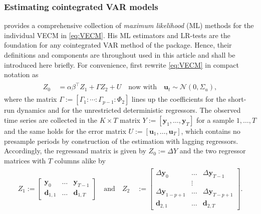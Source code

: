 \subsubsection{Estimating cointegrated VAR models} \label{sec:IndivEst}
\citet{Johansen1991,Johansen1996} provides a comprehensive collection of \textit{maximum likelihood} (ML) methods for the individual VECM in \eqref{eq:VECM}. His ML estimators and LR-tests are the foundation for any cointegrated VAR method of the  package. Hence, their definitions and components are throughout used in this article and shall be introduced here briefly. For convenience, first rewrite \eqref{eq:VECM} in compact notation as
\begin{align} \label{eq:compactVECM}
\begin{split}
	Z_{0} \ & = \alpha\beta^\top Z_{1} + \Gamma Z_{2} + U \quad \text{now with} \quad \boldsymbol{u}_{t} \sim \mathcal{N}(0,\Sigma_u),
\end{split}
\end{align}
where the matrix $ \Gamma := \left[ \Gamma_1 : \cdots : \Gamma_{p-1} : \Phi_2 \right] $ lines up the coefficients for the short-run dynamics and for the unrestricted deterministic regressors. The observed time series are collected in the $ K \times T $ matrix $ Y := \left[ \boldsymbol{y}_{1}, \ldots, \boldsymbol{y}_{T} \right] $ for a sample $ 1,\ldots,T $ and the same holds for the error matrix $ U := \left[ \boldsymbol{u}_{1}, \ldots, \boldsymbol{u}_{T} \right] $, which contains no presample periods by construction of the estimation with lagging regressors. Accordingly, the regressand matrix is given by $Z_0 := \Delta Y $ and the two regressor matrices with $ T $ columns alike by
\begin{align} \label{eq:compactRegressor}
\begin{split}
	Z_1 := 
	\begin{bmatrix} 
		\boldsymbol{y}_{0}  & \ldots & \boldsymbol{y}_{T-1} \\ 
		\boldsymbol{d}_{1,1} & \ldots & \boldsymbol{d}_{1,T} 
	\end{bmatrix}
	\quad \text{and} \quad
	Z_{2} \ & := 
	\begin{bmatrix}
		\Delta \boldsymbol{y}_{0}     & \ldots & \Delta \boldsymbol{y}_{T-1} \\
		                              & \vdots &                             \\
		\Delta \boldsymbol{y}_{1-p+1} & \ldots & \Delta \boldsymbol{y}_{T-p+1} \\
		\boldsymbol{d}_{2,1}           & \ldots & \boldsymbol{d}_{2,T}
	\end{bmatrix}.
\end{split}
\end{align} 
